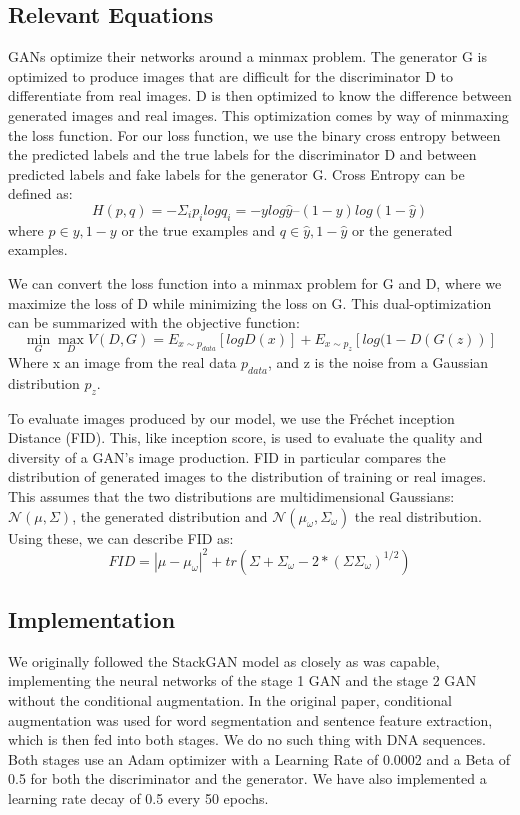 \documentclass{article}
\begin{document}
	\subsection{Relevant Equations}
	GANs optimize their networks around a minmax problem. The generator G is optimized to produce images that are difficult for the discriminator D to differentiate from real images. D is then optimized to know the difference between generated images and real images. This optimization comes by way of minmaxing the loss function.
	For our loss function, we use the binary cross entropy between the predicted labels and the true labels for the discriminator D and between predicted labels and fake labels for the generator G. Cross Entropy can be defined as:
	\begin{equation}
		H(p,q) = -\Sigma_{i}p_{i} log q_{i} = -y log \hat{y} – (1-y) log (1-\hat{y})
	\end{equation}
	where $p \in {y, 1-y}$ or the true examples and $q \in {\hat{y} , 1-\hat{y}}$ or the generated examples.

	We can convert the loss function into a minmax problem for G and D, where we maximize the loss of D while minimizing the loss on G. This dual-optimization can be summarized with the objective function:
	\begin{equation}
		\min_{G} \max_{D} V(D,G)= E _{x \sim p_{data}}[log D(x)] + E _{x \sim p_{z}}[log (1-D(G(z))]
	\end{equation}
	Where x an image from the real data $p_{data}$, and z is the noise from a Gaussian distribution $p_{z}$.
	
	To evaluate images produced by our model, we use the Fréchet inception Distance (FID). This, like inception score, is used to evaluate the quality and diversity of a GAN’s image production. FID in particular compares the distribution of generated images to the distribution of training or real images. This assumes that the two distributions are multidimensional Gaussians: $\mathcal{N}(\mu, \Sigma)$, the generated distribution and $\mathcal{N}(\mu_{\omega}, \Sigma_{\omega})$ the real distribution. Using these, we can describe FID as:
	\begin{equation}
		FID = |\mu-\mu_{\omega}|^{2} + tr(\Sigma + \Sigma_{\omega} - 2*(\Sigma\Sigma_{\omega})^{1/2})
	\end{equation}

	\subsection{Implementation}
	We originally followed the StackGAN model as closely as was capable, implementing the neural networks of the stage 1 GAN and the stage 2 GAN without the conditional augmentation. In the original paper, conditional augmentation was used for word segmentation and sentence feature extraction, which is then fed into both stages. We do no such thing with DNA sequences. Both stages use an Adam optimizer with a Learning Rate of 0.0002 and a Beta of 0.5 for both the discriminator and the generator. We have also implemented a learning rate decay of 0.5 every 50 epochs.
\end{document}
